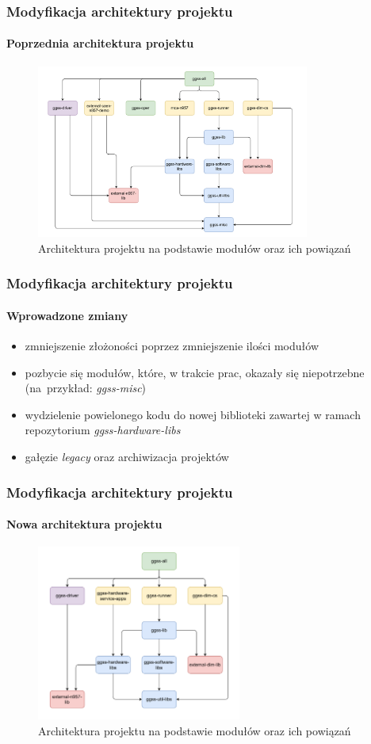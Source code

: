 \documentclass[10pt]{beamer}
\begin{document}
\begin{frame}
\frametitle{Modyfikacja architektury projektu}
\framesubtitle{Poprzednia architektura projektu}
\begin{figure}
    \includegraphics[width=0.8\textwidth]{static/old_structure.pdf}
    \caption{Architektura projektu na podstawie modułów oraz ich powiązań}
\end{figure}
\end{frame}

\begin{frame}
    \frametitle{Modyfikacja architektury projektu}
    \framesubtitle{Wprowadzone zmiany}
    \begin{itemize}
        \item zmniejszenie złożoności poprzez zmniejszenie ilości modułów
        \item pozbycie się modułów, które, w trakcie prac, okazały się niepotrzebne (na~przykład: \emph{ggss-misc})
        \item wydzielenie powielonego kodu do nowej biblioteki zawartej w ramach repozytorium \emph{ggss-hardware-libs}
        \item gałęzie \emph{legacy} oraz archiwizacja projektów
    \end{itemize}
\end{frame}

\begin{frame}
\frametitle{Modyfikacja architektury projektu}
\framesubtitle{Nowa architektura projektu}
\begin{figure}
    \includegraphics[width=0.6\textwidth]{static/new_architecture.pdf}
    \caption{Architektura projektu na podstawie modułów oraz ich powiązań}
\end{figure}
\end{frame}
\end{document}
